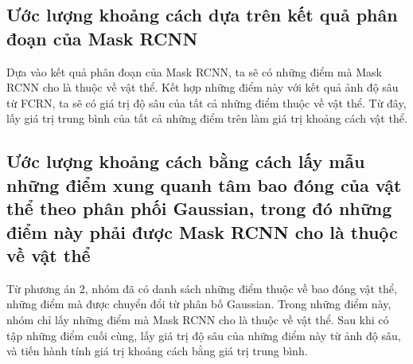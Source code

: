  
\subsection{Ước lượng khoảng cách dựa trên kết quả phân đoạn của Mask RCNN}
Dựa vào kết quả phân đoạn của Mask RCNN, ta sẽ có những điểm mà Mask RCNN cho là thuộc về vật thể. Kết hợp những điểm này với kết quả ảnh độ sâu từ FCRN, ta sẽ có giá trị độ sâu của tất cả những điểm thuộc về vật thể. Từ đây, lấy giá trị trung bình của tất cả những điểm trên làm giá trị khoảng cách vật thể.


\subsection{Ước lượng khoảng cách bằng cách lấy mẫu những điểm xung quanh tâm bao đóng của vật thể theo phân phối Gaussian, trong đó những điểm này phải được Mask RCNN cho là thuộc về vật thể}
Từ phương án 2, nhóm đã có danh sách những điểm thuộc về bao đóng vật thể, những điểm mà được chuyển đổi từ phân bố Gaussian. Trong những điểm này, nhóm chỉ lấy những điểm mà Mask RCNN cho là thuộc về vật thể. Sau khi có tập những điểm cuối cùng, lấy giá trị độ sâu của những điểm này từ ảnh độ sâu, và tiến hành tính giá trị khoảng cách bằng giá trị trung bình. 









